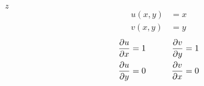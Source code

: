 \item[2.] $z$
\begin{align*}
    u(x,y) &= x\\
    v(x,y) &= y
\end{align*}
\begin{align*}
    \frac{\partial u}{\partial x}  &= 1  &\qquad \frac{\partial v}{\partial y}  &= 1 \\
    \frac{\partial u}{\partial y} &= 0           &\qquad \frac{\partial v}{\partial x} &= 0
\end{align*}
